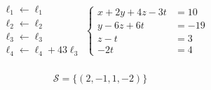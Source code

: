 {{$$\begin{aligned}
& \begin{array}{l}
\ell_1 \leftarrow \ell_1 \\
\ell_2 \leftarrow \ell_2 \\
\ell_3 \leftarrow \ell_3 \\
\ell_4 \leftarrow \ell_4+43 \ell_3
\end{array}\left\{\begin{aligned}
x+2 y+4 z-3 t & =10 \\
y-6 z+6 t & =-19 \\
z-t & =3 \\
-2 t & =4
\end{aligned}\right. \\
&
\end{aligned}
$$

$$\mathcal{S}  = \{(2,-1,1,-2)\}$$ }
}
